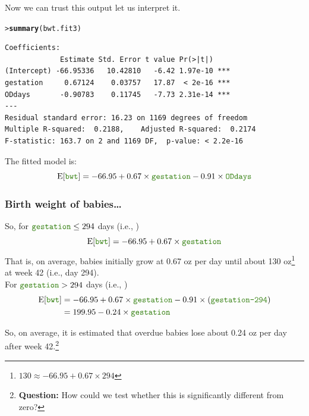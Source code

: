 \documentclass{beamer}\usepackage[]{graphicx}\usepackage[]{xcolor}
\makeatletter
\newcommand{\hlstd}[1]{\textcolor[rgb]{0.345,0.345,0.345}{#1}}%
\newcommand{\hlkwd}[1]{\textcolor[rgb]{0.737,0.353,0.396}{\textbf{#1}}}%
\newenvironment{kframe}{%
 \def\at@end@of@kframe{}%
 \ifinner\ifhmode%
  \def\at@end@of@kframe{\end{minipage}}%
  \begin{minipage}{\columnwidth}%
 \fi\fi%
 \def\FrameCommand##1{\hskip\@totalleftmargin \hskip-\fboxsep
 \colorbox{shadecolor}{##1}\hskip-\fboxsep
     \hskip-\linewidth \hskip-\@totalleftmargin \hskip\columnwidth}%
 \MakeFramed {\advance\hsize-\width
   \@totalleftmargin\z@ \linewidth\hsize
   \@setminipage}}%
 {\par\unskip\endMakeFramed%
 \at@end@of@kframe}
\newenvironment{knitrout}{}{} %
\makeatother
\begin{document}
\begin{frame}[fragile]

Now we can trust this output let us interpret it.
\begin{knitrout}\scriptsize
{}\color{fgcolor}\begin{kframe}
\begin{alltt}
\hlstd{> }\hlkwd{summary}\hlstd{(bwt.fit3)}
\end{alltt}
\end{kframe}
\end{knitrout}

\begin{knitrout}\scriptsize
{}\color{fgcolor}\begin{kframe}
\begin{verbatim}
Coefficients:
             Estimate Std. Error t value Pr(>|t|)    
(Intercept) -66.95336   10.42810   -6.42 1.97e-10 ***
gestation     0.67124    0.03757   17.87  < 2e-16 ***
ODdays       -0.90783    0.11745   -7.73 2.31e-14 ***
---
Residual standard error: 16.23 on 1169 degrees of freedom
Multiple R-squared:  0.2188,	Adjusted R-squared:  0.2174 
F-statistic: 163.7 on 2 and 1169 DF,  p-value: < 2.2e-16
\end{verbatim}
\end{kframe}
\end{knitrout}

The fitted model is:
\[
 \E[\rcode{bwt}]=-66.95 + 0.67\times\rcode{gestation} -0.91\times\rcode{ODdays}  
\]
\end{frame}



\begin{frame}[fragile]
\frametitle{Birth weight of babies\ldots}
So, for $\rcode{gestation} \le 294$ days (i.e., )
\[
\E[\rcode{bwt}]=-66.95+0.67\times\rcode{gestation}
\]
That is, on average, babies initially grow at 0.67 oz per day until about 130 oz\footnote{
$130 \approx -66.95 + 0.67\times 294$} at week 42 (i.e., day 294).\\
\bigskip
For $\rcode{gestation} > 294$ days (i.e., )
\begin{align*}
\E[\rcode{bwt}]&=-66.95+0.67\times\rcode{gestation}  -0.91\times(\rcode{gestation-294})\\
           &= 199.95 - 0.24\times\rcode{gestation}
\end{align*}

So, on average, it is estimated that overdue babies lose about 0.24 oz per day after week 42.\footnote{{\bf Question:} How could we test whether this is significantly different from zero?}
\end{frame}
\end{document}

